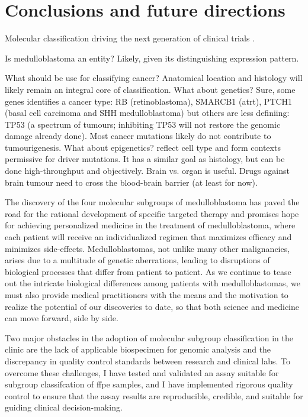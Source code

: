 \chapter{Conclusions and future directions}
\label{ch:conclusion}

Molecular classification driving the next generation of clinical trials .

Is medulloblastoma an entity?
Likely, given its distinguishing expression pattern.

What should be use for classifying cancer?
Anatomical location and histology will likely remain an integral core of classification.
What about genetics? Sure, some genes identifies a cancer type: RB (retinoblastoma), SMARCB1 (\gls{atrt}), PTCH1 (basal cell carcinoma and SHH medulloblastoma) but others are less definiing: TP53 (a spectrum of tumours; inhibiting TP53 will not restore the genomic damage already done). Most cancer mutations likely do not contribute to tumourigenesis.
What about epigenetics? reflect cell type and form contexts permissive for driver mutations. It has a similar goal as histology, but can be done high-throughput and objectively.
Brain vs. organ is useful. Drugs against brain tumour need to cross the blood-brain barrier (at least for now).

The discovery of the four molecular subgroups of medulloblastoma has paved the road for the rational development of specific targeted therapy and promises hope for achieving personalized medicine in the treatment of medulloblastoma, where each patient will receive an individualized regimen that maximizes efficacy and minimizes side-effects. Medulloblastomas, not unlike many other malignancies, arises due to a multitude of genetic aberrations, leading to disruptions of biological processes that differ from patient to patient. As we continue to tease out the intricate biological differences among patients with medulloblastomas, we must also provide medical practitioners with the means and the motivation to realize the potential of our discoveries to date, so that both science and medicine can move forward, side by side.

Two major obstacles in the adoption of molecular subgroup classification in the clinic are the lack of applicable biospecimen for genomic analysis and the discrepancy in quality control standards between research and clinical labs. To overcome these challenges, I have tested and validated an assay suitable for subgroup classifcation of \gls{ffpe} samples, and I have implemented rigorous quality control to ensure that the assay results are reproducible, credible, and suitable for guiding clinical decision-making.

